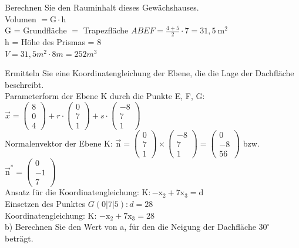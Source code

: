 \documentclass[10pt]{article}
\begin{document}
Berechnen Sie den Rauminhalt dieses Gewächshauses.\\
Volumen $=\mathrm{G} \cdot \mathrm{h}$\\
G = Grundfläche $=$ Trapezfläche $A B E F=\frac{4+5}{2} \cdot 7=31,5 \mathrm{~m}^{2}$\\
h = Höhe des Prismas = 8\\
$V=31,5 m^{2} \cdot 8 m=252 m^{3}$

Ermitteln Sie eine Koordinatengleichung der Ebene, die die Lage der Dachfläche beschreibt.\\
Parameterform der Ebene K durch die Punkte E, F, G: $\vec{x}=\left(\begin{array}{l}8 \\ 0 \\ 4\end{array}\right)+r \cdot\left(\begin{array}{l}0 \\ 7 \\ 1\end{array}\right)+s \cdot\left(\begin{array}{c}-8 \\ 7 \\ 1\end{array}\right)$\\
Normalenvektor der Ebene K: $\overrightarrow{\mathrm{n}}=\left(\begin{array}{l}0 \\ 7 \\ 1\end{array}\right) \times\left(\begin{array}{c}-8 \\ 7 \\ 1\end{array}\right)=\left(\begin{array}{c}0 \\ -8 \\ 56\end{array}\right)$ bzw. $\overrightarrow{\mathrm{n}}^{*}=\left(\begin{array}{c}0 \\ -1 \\ 7\end{array}\right)$\\
Ansatz für die Koordinatengleichung: $\mathrm{K}:-\mathrm{x}_{2}+7 \mathrm{x}_{3}=\mathrm{d}$\\
Einsetzen des Punktes $G(0|7| 5): d=28$\\
Koordinatengleichung: K: $-\mathrm{x}_{2}+7 \mathrm{x}_{3}=28$\\
b) Berechnen Sie den Wert von a, für den die Neigung der Dachfläche $30^{\circ}$ beträgt.
\end{document}
